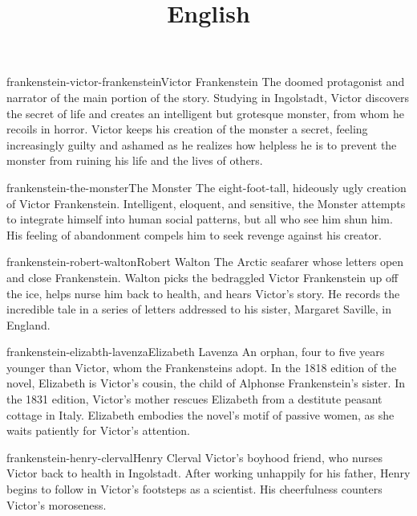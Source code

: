 \documentclass[preview]{standalone}
\begin{document}
\title{English}
\genpage

\begin{snippetcharacter}{frankenstein-victor-frankenstein}{Victor Frankenstein}
    The doomed protagonist and narrator of the main portion of the story. Studying in Ingolstadt, Victor discovers the secret of life and creates an intelligent but grotesque monster, from whom he recoils in horror. Victor keeps his creation of the monster a secret, feeling increasingly guilty and ashamed as he realizes how helpless he is to prevent the monster from ruining his life and the lives of others.
\end{snippetcharacter}

\begin{snippetcharacter}{frankenstein-the-monster}{The Monster}
    The eight-foot-tall, hideously ugly creation of Victor Frankenstein. Intelligent, eloquent, and sensitive, the Monster attempts to integrate himself into human social patterns, but all who see him shun him. His feeling of abandonment compels him to seek revenge against his creator.
\end{snippetcharacter}

\begin{snippetcharacter}{frankenstein-robert-walton}{Robert Walton}
    The Arctic seafarer whose letters open and close Frankenstein. Walton picks the bedraggled Victor Frankenstein up off the ice, helps nurse him back to health, and hears Victor's story. He records the incredible tale in a series of letters addressed to his sister, Margaret Saville, in England.
\end{snippetcharacter}

\begin{snippetcharacter}{frankenstein-elizabth-lavenza}{Elizabeth Lavenza}
    An orphan, four to five years younger than Victor, whom the Frankensteins adopt. In the 1818 edition of the novel, Elizabeth is Victor's cousin, the child of Alphonse Frankenstein's sister. In the 1831 edition, Victor's mother rescues Elizabeth from a destitute peasant cottage in Italy. Elizabeth embodies the novel's motif of passive women, as she waits patiently for Victor's attention.
\end{snippetcharacter}

\begin{snippetcharacter}{frankenstein-henry-clerval}{Henry Clerval}
    Victor's boyhood friend, who nurses Victor back to health in Ingolstadt. After working unhappily for his father, Henry begins to follow in Victor's footsteps as a scientist. His cheerfulness counters Victor's moroseness.
\end{snippetcharacter}
\end{document}
